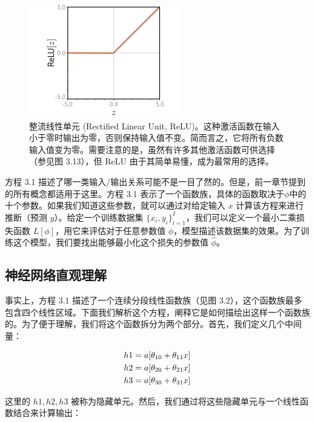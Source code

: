 \begin{figure}[ht!]
	\centering
	\includegraphics[width=0.7\linewidth]{png/chapter3/ShallowReLU.png}
\caption{整流线性单元 (Rectified Linear Unit, ReLU)。这种激活函数在输入小于零时输出为零，否则保持输入值不变。简而言之，它将所有负数输入值变为零。需要注意的是，虽然有许多其他激活函数可供选择（参见图 3.13），但 ReLU 由于其简单易懂，成为最常用的选择。}
\end{figure}

方程 3.1 描述了哪一类输入/输出关系可能不是一目了然的。但是，前一章节提到的所有概念都适用于这里。方程 3.1 表示了一个函数族，具体的函数取决于\(\phi\)中的十个参数。如果我们知道这些参数，就可以通过对给定输入 \(x\) 计算该方程来进行推断（预测 \(y\)）。给定一个训练数据集 \(\{{x_i,y_i}\}^I_{i=1}\)，我们可以定义一个最小二乘损失函数 \(L[\phi]\)，用它来评估对于任意参数值 \(\phi\)，模型描述该数据集的效果。为了训练这个模型，我们要找出能够最小化这个损失的参数值 \(\hat \phi\)。


\subsection{神经网络直观理解}
事实上，方程 3.1 描述了一个连续分段线性函数族（见图 3.2），这个函数族最多包含四个线性区域。下面我们解析这个方程，阐释它是如何描绘出这样一个函数族的。为了便于理解，我们将这个函数拆分为两个部分。首先，我们定义几个中间量：


\begin{align}
	h1 = a[\theta_{10} + \theta_{11}x] \notag \\
	h2 = a[\theta_{20} + \theta_{21}x] \notag \\
	h3 = a[\theta_{30} + \theta_{31}x]  
\end{align} 

这里的 \(h1, h2, h3\) 被称为隐藏单元。然后，我们通过将这些隐藏单元与一个线性函数结合来计算输出：

